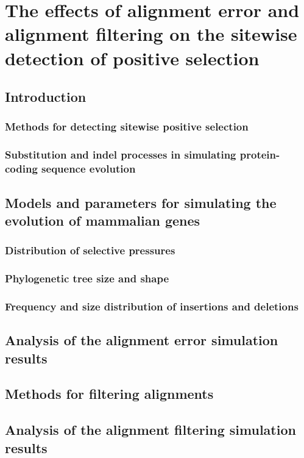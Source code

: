 \chapter{The effects of alignment error and alignment filtering on the sitewise detection of positive selection}
\label{ch_indels1}

\section{Introduction}

\subsection{Methods for detecting sitewise positive selection}

\subsection{Substitution and indel processes in simulating protein-coding sequence evolution}

\section{Models and parameters for simulating the evolution of mammalian genes}

\subsection{Distribution of selective pressures}

\subsection{Phylogenetic tree size and shape}

\subsection{Frequency and size distribution of insertions and deletions}

\section{Analysis of the alignment error simulation results}

\section{Methods for filtering alignments}

\section{Analysis of the alignment filtering simulation results}
